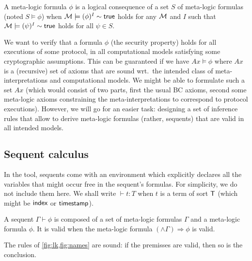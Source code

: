 \begin{definition}
  A meta-logic formula $\phi$ is a
  logical consequence of a set $S$ of meta-logic formulas
  (noted $S \models \phi$)
  when
  $\mathcal{M}\models(\phi)^I\sim\mathsf{true}$ holds for any $\mathcal{M}$ and $I$ such that
  $\mathcal{M}\models(\psi)^I\sim\mathsf{true}$ holds for all $\psi\in S$.
\end{definition}

We want to verify that a formula $\phi$ (the security property)
holds for all executions of some protocol, in all computational models
satisfying some cryptographic assumptions.
This can be guaranteed if we have $Ax\models\phi$
where $Ax$ is a (recursive) set of axioms that are sound
wrt.\ the intended class of meta-interpretations and computational models.
We might be able to formulate such a set $Ax$ (which would consist of
two parts, first the usual BC axioms, second some meta-logic axioms
constraining the meta-interpretations to correspond to protocol executions).
However, we will go for an easier task: designing a set of inference
rules that allow to derive meta-logic formulas (rather, sequents)
that are valid in all intended models.

\subsection{Sequent calculus}

In the tool, sequents come with an environment which explicitly
declares all the variables that might occur free in the sequent's formulas.
For simplicity, we do not include them here. We shall write $\vdash t:T$
when $t$ is a term of sort $\textsf{T}$ (which might be $\textsf{index}$ or $\textsf{timestamp}$).

\begin{definition}
  A sequent $\Gamma \vdash \phi$ is composed of a set of meta-logic formulas
  $\Gamma$ and a meta-logic formula $\phi$.
  It is valid when the meta-logic formula
  $(\wedge\Gamma) \Rightarrow \phi$ is valid.
\end{definition}

\begin{proposition}
  The rules of \cref{fig:lk,fig:names} are sound: if the premisses are valid,
  then so is the conclusion.
\end{proposition}

